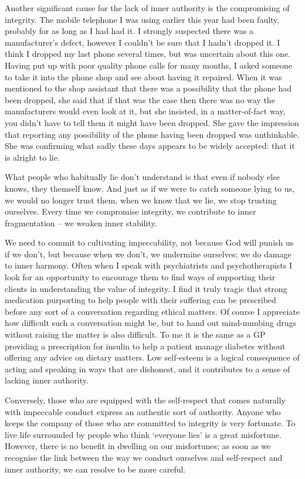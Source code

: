 Another significant cause for the lack of inner authority is the
compromising of integrity. The mobile telephone I was using earlier this
year had been faulty, probably for as long as I had had it. I strongly suspected there was a manufacturer's defect, however I couldn't be sure that I
hadn't dropped it. I think I dropped my last phone several times, but
was uncertain about this one. Having put up with poor quality phone
calls for many months, I asked someone to take it into the phone shop
and see about having it repaired. When it was mentioned to the shop
assistant that there was a possibility that the phone had been dropped,
she said that if that was the case then there was no way the
manufacturers would even look at it, but she insisted, in a
matter-of-fact way, you didn't have to tell them it might have been
dropped. She gave the impression that reporting any possibility of the
phone having been dropped was unthinkable. She was confirming what sadly
these days appears to be widely accepted: that it is alright to lie.

What people who habitually lie don't understand is that even if nobody
else knows, they themself know. And just as if we were to catch someone
lying to us, we would no longer trust them, when we know that we lie, we
stop trusting ourselves. Every time we compromise integrity, we
contribute to inner fragmentation -- we weaken inner stability.

We need to commit to cultivating impeccability, not because God will
punish us if we don't, but because when we don't, we undermine
ourselves; we do damage to inner harmony. Often when I speak with
psychiatrists and psychotherapists I look for an opportunity to
encourage them to find ways of supporting their clients in understanding
the value of integrity. I find it truly tragic that strong medication
purporting to help people with their suffering can be prescribed before
any sort of a conversation regarding ethical matters. Of course I
appreciate how difficult such a conversation might be, but to hand out
mind-numbing drugs without raising the matter is also difficult. To me
it is the same as a GP providing a prescription for insulin to help a
patient manage diabetes without offering any advice on dietary matters.
Low self-esteem is a logical consequence of acting and speaking in ways
that are dishonest, and it contributes to a sense of lacking inner
authority.

Conversely, those who are equipped with the self-respect that comes
naturally with impeccable conduct express an authentic sort of
authority. Anyone who keeps the company of those who are committed to
integrity is very fortunate. To live life surrounded by people who think
`everyone lies' is a great misfortune. However, there is no benefit in
dwelling on our misfortunes; as soon as we recognise the link between
the way we conduct ourselves and self-respect and inner authority, we
can resolve to be more careful.

